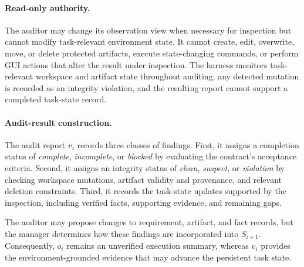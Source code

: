 \paragraph{Read-only authority.}
The auditor may change its observation view when necessary for
inspection but cannot modify task-relevant environment state. It cannot
create, edit, overwrite, move, or delete protected artifacts, execute
state-changing commands, or perform GUI actions that alter the result
under inspection. The harness monitors task-relevant workspace and
artifact state throughout auditing; any detected mutation is recorded
as an integrity violation, and the resulting report cannot support a
completed task-state record.

\paragraph{Audit-result construction.}
The audit report $v_i$ records three classes of findings. First, it
assigns a completion status of \textit{complete},
\textit{incomplete}, or \textit{blocked} by evaluating the contract's
acceptance criteria. Second, it assigns an integrity status of
\textit{clean}, \textit{suspect}, or \textit{violation} by checking
workspace mutations, artifact validity and provenance, and relevant
deletion constraints. Third, it records the task-state updates supported
by the inspection, including verified facts, supporting evidence, and
remaining gaps.

The auditor may propose changes to requirement, artifact, and fact
records, but the manager determines how these findings are incorporated
into $S_{i+1}$. Consequently, $o_i$ remains an unverified execution
summary, whereas $v_i$ provides the environment-grounded evidence that
may advance the persistent task state.